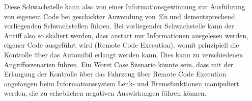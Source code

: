 \documentclass[a4paper,
DIV=13,
12pt,
BCOR=10mm,
department=FakIM,
oneside,
parskip=half,
automark,
listof=totocnumbered,
bibliography=totocnumbered,
acronym=totocnumbered
] {OTHRartcl}
\begin{document}
Diese Schwachstelle kann also von einer Informationsgewinnung zur Ausführung von eigenem Code bei geschickter Anwendung von \textit{\%n} und dementsprechend vorliegenden Schwachstellen führen.
Bei vorliegender Schwachstelle kann der Anriff also so skaliert werden, dass anstatt nur Informationen ausgelesen werden, eigener Code ausgeführt wird (Remote Code Execution),
womit prinzipiell die Kontrolle über das Automibil erlangt werden kann.
Dies kann zu verschiedenen Angriffsszenarien führen. Ein Worst Case Szenario könnte sein, dass mit der Erlangung der Kontrolle über das Fahrzeug über Remote Code Execution angefangen beim
Informationssystem Lenk- und Bremsfunktionen manipuliert werden, die zu erheblichen negativen Auswirkungen führen können. \cite{car format string vuln.}

\end{document}
